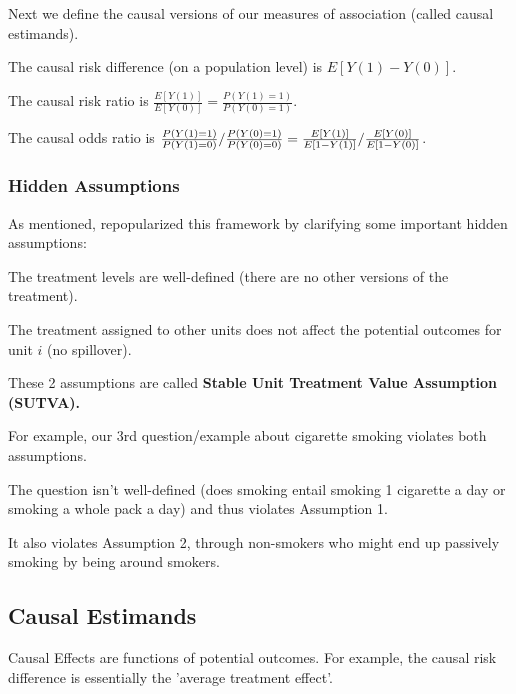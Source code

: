 \documentclass[11pt]{elegantbook}
\begin{document}
Next we define the causal versions of our measures of association (called  causal estimands).

\begin{definition}
    The causal risk difference (on a population level) is $E[Y(1) - Y(0)]$.
\end{definition}

\begin{definition}
    The causal risk ratio is $\frac{E[Y(1)]}{E[Y(0)]} = \frac{P(Y(1) = 1)}{P(Y(0) = 1)}$.
\end{definition}

\begin{definition}
    The causal odds ratio is $\frac{P(Y(1) = 1)}{P(Y(1) = 0)}/\frac{P(Y(0) = 1)}{P(Y(0) = 0)} = \\ 
    \frac{E[Y(1)]}{E[1-Y(1)]}/\frac{E[Y(0)]}{E[1-Y(0)]}$.
\end{definition}

\subsubsection{Hidden Assumptions}

As mentioned, \cite{rubin1980} repopularized this framework by clarifying some important hidden assumptions:

\begin{assumption}[Consistency]
The treatment levels are well-defined (there are no other versions of the treatment).
\end{assumption}

\begin{assumption}[No Interference]
The treatment assigned to other units does not affect the potential outcomes for unit $i$ (no spillover).
\end{assumption}

These 2 assumptions are called \textbf{Stable Unit Treatment Value Assumption (SUTVA).}

For example, our 3rd question/example about cigarette smoking violates both assumptions.

The question isn't well-defined (does smoking entail  smoking 1 cigarette a day or smoking a whole pack a day) and thus violates Assumption 1.

It also violates Assumption 2, through non-smokers who might end up passively smoking by being around smokers.

\subsection{Causal Estimands}
Causal Effects are functions of potential outcomes. For example, the causal risk difference is essentially the 'average treatment effect'.
\end{document}
